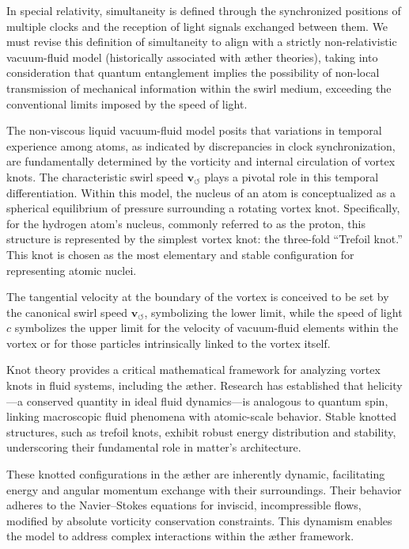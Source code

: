\documentclass[10pt,reprint,aps,onecolumn,nofootinbib]{revtex4-2}
\newcommand{\vswirl}{\mathbf{v}_{\!\boldsymbol{\circlearrowleft}}}
\begin{document}
        In special relativity, simultaneity is defined through the synchronized positions of multiple clocks and the reception of light signals exchanged between them.\cite{Einstein1905} We must revise this definition of simultaneity to align with a strictly non-relativistic vacuum-fluid model (historically associated with æther theories), taking into consideration that quantum entanglement implies the possibility of non-local transmission of mechanical information within the swirl medium, exceeding the conventional limits imposed by the speed of light.

        The non-viscous liquid vacuum-fluid model posits that variations in temporal experience among atoms, as indicated by discrepancies in clock synchronization, are fundamentally determined by the vorticity and internal circulation of vortex knots. The characteristic swirl speed \(\vswirl\) plays a pivotal role in this temporal differentiation. Within this model, the nucleus of an atom is conceptualized as a spherical equilibrium of pressure surrounding a rotating vortex knot. Specifically, for the hydrogen atom's nucleus, commonly referred to as the proton, this structure is represented by the simplest vortex knot: the three-fold ``Trefoil knot.'' This knot is chosen as the most elementary and stable configuration for representing atomic nuclei.

        The tangential velocity at the boundary of the vortex is conceived to be set by the canonical swirl speed \(\vswirl\), symbolizing the lower limit, while the speed of light \(c\) symbolizes the upper limit for the velocity of vacuum-fluid elements within the vortex or for those particles intrinsically linked to the vortex itself.

        Knot theory provides a critical mathematical framework for analyzing vortex knots in fluid systems, including the æther.\cite{Ricca2009} Research has established that helicity---a conserved quantity in ideal fluid dynamics---is analogous to quantum spin, linking macroscopic fluid phenomena with atomic-scale behavior.\cite{Moffatt1969} Stable knotted structures, such as trefoil knots, exhibit robust energy distribution and stability, underscoring their fundamental role in matter's architecture.

        These knotted configurations in the æther are inherently dynamic, facilitating energy and angular momentum exchange with their surroundings. Their behavior adheres to the Navier--Stokes equations for inviscid, incompressible flows, modified by absolute vorticity conservation constraints.\cite{Batchelor1967,LandauLifshitz1987} This dynamism enables the model to address complex interactions within the æther framework.
\end{document}
